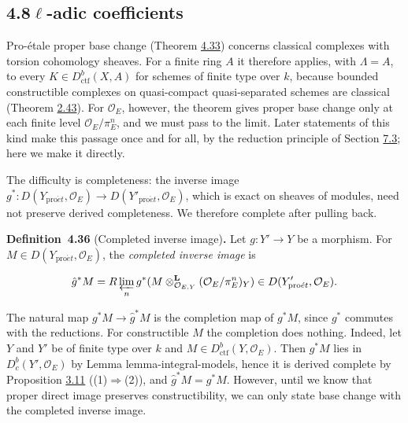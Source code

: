 \documentclass[11pt]{article}
\newenvironment{bpstatement}[2]{\par\addvspace{0.6\baselineskip}\noindent\textbf{#1}#2\textbf{.}\enspace\ignorespaces}
  {\par\addvspace{0.4\baselineskip}}
\providecommand{\Dbc}{}\renewcommand{\Dbc}{D^b_c}
\begin{document}
\subsection*{\texorpdfstring{4.8\quad $\ell$-adic coefficients}{4.8 ell-adic coefficients}}
\label{bp392}%
\label{bp393}%
Pro-étale proper base change (Theorem \hyperref[bp382]{4.33}) concerns classical complexes with torsion cohomology sheaves. For a finite ring \(A\) it therefore applies, with \(\Lambda=A\), to every \(K\in D^b_{\mathrm{ctf}}(X,A)\) for schemes of finite type over \(k\), because bounded constructible complexes on quasi-compact quasi-separated schemes are classical (Theorem \hyperref[bp129]{2.43}). For \(\mathcal O_E\), however, the theorem gives proper base change only at each finite level \(\mathcal O_E/\pi_E^n\), and we must pass to the limit. Later statements of this kind make this passage once and for all, by the reduction principle of Section \hyperref[bp632]{7.3}; here we make it directly.

The difficulty is completeness: the inverse image \(g^*:D(Y_{\mathrm{pro}\acute{e}t},\mathcal O_E)\to D(Y'_{\mathrm{pro}\acute{e}t},\mathcal O_E)\), which is exact on sheaves of modules, need not preserve derived completeness. We therefore complete after pulling back.

\label{bp394}%
\begin{bpstatement}{Definition~4.36}{ (Completed inverse image)}
Let \(g:Y'\to Y\) be a morphism. For \(M\in D(Y_{\mathrm{pro}\acute{e}t},\mathcal O_E)\), the \emph{completed inverse image} is

\[
\hat g^*M
=R\varprojlim_n g^*(M\otimes^{\mathbf L}_{\mathcal O_{E,Y}}
(\mathcal O_E/\pi_E^n)_Y)
\in D(Y'_{\mathrm{pro}\acute{e}t},\mathcal O_E).
\]
\end{bpstatement}

\label{bp395}%
The natural map \(g^*M\to\hat g^*M\) is the completion map of \(g^*M\), since \(g^*\) commutes with the reductions. For constructible \(M\) the completion does nothing. Indeed, let \(Y\) and \(Y'\) be of finite type over \(k\) and \(M\in D^b_{\mathrm{ctf}}(Y,\mathcal O_E)\). Then \(g^*M\) lies in \(\Dbc(Y',\mathcal O_E)\) by Lemma lemma-integral-models, hence it is derived complete by Proposition \hyperref[bp226]{3.11} ((1)\(\Rightarrow\)(2)), and \(\hat g^*M=g^*M\). However, until we know that proper direct image preserves constructibility, we can only state base change with the completed inverse image.
\end{document}
